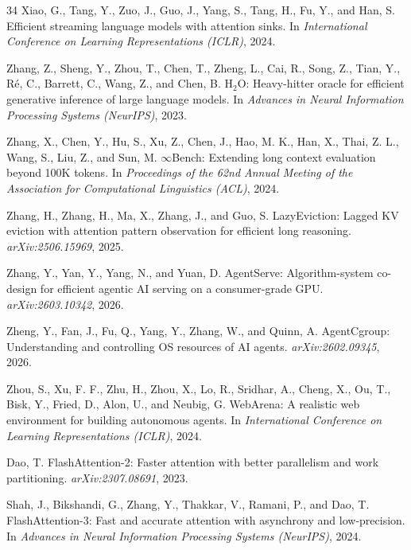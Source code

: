 \documentclass{article}
\begin{document}
\begin{thebibliography}{34}
Xiao, G., Tang, Y., Zuo, J., Guo, J., Yang, S., Tang, H., Fu, Y.,
  and Han, S.
\newblock Efficient streaming language models with attention sinks.
\newblock In \emph{International Conference on Learning Representations
  (ICLR)}, 2024.

Zhang, Z., Sheng, Y., Zhou, T., Chen, T., Zheng, L., Cai, R., Song, Z.,
  Tian, Y., R{\'e}, C., Barrett, C., Wang, Z., and Chen, B.
\newblock H$_2$O: Heavy-hitter oracle for efficient generative inference
  of large language models.
\newblock In \emph{Advances in Neural Information Processing Systems
  (NeurIPS)}, 2023.

Zhang, X., Chen, Y., Hu, S., Xu, Z., Chen, J., Hao, M. K., Han, X.,
  Thai, Z. L., Wang, S., Liu, Z., and Sun, M.
\newblock $\infty$Bench: Extending long context evaluation beyond 100K
  tokens.
\newblock In \emph{Proceedings of the 62nd Annual Meeting of the
  Association for Computational Linguistics (ACL)}, 2024.

Zhang, H., Zhang, H., Ma, X., Zhang, J., and Guo, S.
\newblock LazyEviction: Lagged KV eviction with attention pattern
  observation for efficient long reasoning.
\newblock \emph{arXiv:2506.15969}, 2025.

Zhang, Y., Yan, Y., Yang, N., and Yuan, D.
\newblock AgentServe: Algorithm-system co-design for efficient agentic
  AI serving on a consumer-grade GPU.
\newblock \emph{arXiv:2603.10342}, 2026.

Zheng, Y., Fan, J., Fu, Q., Yang, Y., Zhang, W., and Quinn, A.
\newblock AgentCgroup: Understanding and controlling OS resources of AI
  agents.
\newblock \emph{arXiv:2602.09345}, 2026.

Zhou, S., Xu, F. F., Zhu, H., Zhou, X., Lo, R., Sridhar, A.,
  Cheng, X., Ou, T., Bisk, Y., Fried, D., Alon, U., and Neubig, G.
\newblock WebArena: A realistic web environment for building autonomous
  agents.
\newblock In \emph{International Conference on Learning
  Representations (ICLR)}, 2024.

Dao, T.
\newblock FlashAttention-2: Faster attention with better parallelism and
  work partitioning.
\newblock \emph{arXiv:2307.08691}, 2023.

Shah, J., Bikshandi, G., Zhang, Y., Thakkar, V., Ramani, P., and Dao, T.
\newblock FlashAttention-3: Fast and accurate attention with asynchrony
  and low-precision.
\newblock In \emph{Advances in Neural Information Processing Systems
  (NeurIPS)}, 2024.

\end{thebibliography}
\end{document}
